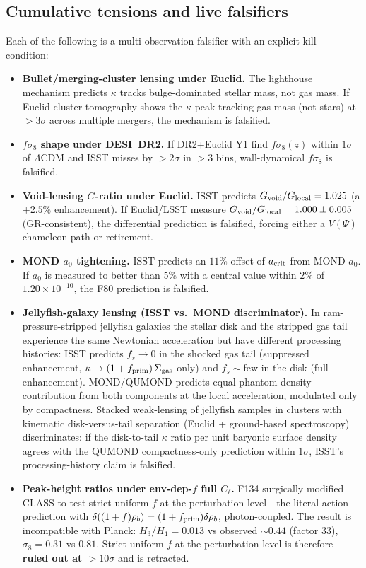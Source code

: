 \documentclass[aps,prd,twocolumn,nofootinbib,floatfix,superscriptaddress]{revtex4-2}
\newcommand{\fprim}{f_{\rm prim}}
\begin{document}
\subsection{Cumulative tensions and live falsifiers}

Each of the following is a multi-observation falsifier with an
explicit kill condition:

\begin{itemize}
\item \textbf{Bullet/merging-cluster lensing under Euclid.} The
lighthouse mechanism predicts $\kappa$ tracks bulge-dominated
stellar mass, not gas mass. If Euclid cluster tomography shows the
$\kappa$ peak tracking gas mass (not stars) at $>3\sigma$ across
multiple mergers, the mechanism is falsified.
\item \textbf{$f\sigma_8$ shape under DESI~DR2.} If DR2+Euclid Y1
find $f\sigma_8(z)$ within $1\sigma$ of $\Lambda$CDM and ISST misses
by $>2\sigma$ in $>3$ bins, wall-dynamical $f\sigma_8$ is falsified.
\item \textbf{Void-lensing $G$-ratio under Euclid.} ISST predicts
$G_{\rm void}/G_{\rm local}=1.025$ (a $+2.5\%$ enhancement). If
Euclid/LSST measure $G_{\rm void}/G_{\rm local}=1.000\pm 0.005$
(GR-consistent), the differential prediction is falsified, forcing
either a $V(\Psi)$ chameleon path or retirement.
\item \textbf{MOND $a_0$ tightening.} ISST predicts an $11\%$ offset
of $a_{\rm crit}$ from MOND $a_0$. If $a_0$ is measured to better
than $5\%$ with a central value within $2\%$ of
$1.20\times 10^{-10}$, the F80 prediction is falsified.
\item \textbf{Jellyfish-galaxy lensing (ISST vs.\ MOND
discriminator).} In ram-pressure-stripped jellyfish galaxies the
stellar disk and the stripped gas tail experience the same Newtonian
acceleration but have different processing histories: ISST predicts
$f_s\to 0$ in the shocked gas tail (suppressed enhancement,
$\kappa\to (1+f_{\rm prim})\,\Sigma_{\rm gas}$ only) and
$f_s\sim$few in the disk (full enhancement). MOND/QUMOND predicts
equal phantom-density contribution from both components at the
local acceleration, modulated only by compactness. Stacked weak-lensing
of jellyfish samples in clusters with kinematic disk-versus-tail
separation (Euclid + ground-based spectroscopy) discriminates: if the
disk-to-tail $\kappa$ ratio per unit baryonic surface density agrees
with the QUMOND compactness-only prediction within $1\sigma$, ISST's
processing-history claim is falsified.
\item \textbf{Peak-height ratios under env-dep-$f$ full $C_\ell$.}
F134 surgically modified CLASS to test strict uniform-$f$ at the
perturbation level---the literal action prediction with
$\delta((1+f)\rho_b) = (1+\fprim)\delta\rho_b$, photon-coupled.
The result is incompatible with Planck: $H_3/H_1 = 0.013$ vs
observed $\sim 0.44$ (factor $33$), $\sigma_8 = 0.31$ vs $0.81$.
Strict uniform-$f$ at the perturbation level is therefore
\textbf{ruled out at $>10\sigma$} and is retracted.


\end{itemize}
\end{document}
